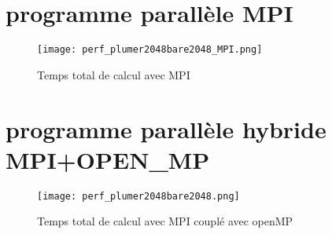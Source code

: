 \section{programme parallèle MPI}

\begin{figure}[htp]
\centering
\texttt{[image: perf\_plumer2048bare2048\_MPI.png]}
\caption{Temps total de calcul avec MPI}
\label{fig: perf_plumer2048bare2048}
\end{figure}

\section{programme parallèle hybride MPI+OPEN\_MP}

\begin{figure}[htp]
\centering
\texttt{[image: perf\_plumer2048bare2048.png]}
\caption{Temps total de calcul avec MPI couplé avec openMP}
\label{fig: perf_plumer2048bare2048}
\end{figure}
